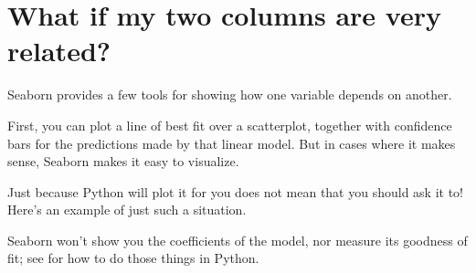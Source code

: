 \documentclass[letterpaper,10pt,english]{jupyterBook}
\begin{document}
\noindent{}


\section{What if my two columns are very related?}
\label{\detokenize{chapter-10-visualization:what-if-my-two-columns-are-very-related}}
\sphinxAtStartPar
Seaborn provides a few tools for showing how one variable depends on another.

\sphinxAtStartPar
First, you can plot a line of best fit over a scatterplot, together with confidence bars for the predictions made by that linear model.    But in cases where it makes sense, Seaborn makes it easy to visualize.

\sphinxAtStartPar
{}  Just because Python will plot it for you does not mean that you should ask it to!  Here’s an example of just such a situation.

\begin{sphinxVerbatim}[commandchars=\\\{\}]
    
 
          
          
               
\end{sphinxVerbatim}

\noindent{}

\sphinxAtStartPar
Seaborn won’t show you the coefficients of the model, nor measure its goodness of fit; see {\hyperref[\detokenize{GB213-review-in-Python::doc}]{}} for how to do those things in Python.
\end{document}
